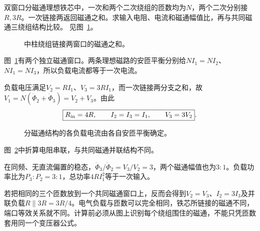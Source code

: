 \begin{exercise}[相同匝数但不同磁通结构]\label{ex:i2-h13}
双窗口分磁通理想铁芯中，一次和两个二次绕组的匝数均为$N$，两个二次分别接$R,3R$。一次链接两返回磁通之和。求输入电阻、电流和磁通幅值比，再与共同磁通三绕组结构比较。 见图~\ref{fig:i2-h13-q}。
\end{exercise}

\begin{figure}[H]\centering
{}
\caption{中柱绕组链接两窗口的磁通之和。}\label{fig:i2-h13-q}
\end{figure}
\begin{solution}
图~\ref{fig:i2-h13-q}有两个独立磁通窗口。两条理想磁路的安匝平衡分别给$NI_1=NI_2$、$NI_1=NI_3$，所以负载电流都等于一次电流。

负载电压满足$V_2=RI_1$、$V_3=3RI_1$，而一次链接两分支之和，故$V_1=N(\dot\Phi_2+\dot\Phi_3)=V_2+V_3$。由此
\[\boxed{R_{\rm in}=4R,\qquad I_2=I_3=I_1,\qquad V_3=3V_2}.
\]

\begin{figure}[H]\centering
{}
\caption{分磁通结构的各负载电流由各自安匝平衡确定。}\label{fig:i2-h13-s}
\end{figure}

图~\ref{fig:i2-h13-s}中折算电阻串联，与共同磁通并联结构不同。

在同频、无直流偏置的稳态，$\dot\Phi_3/\dot\Phi_2=V_3/V_2=3$，两个磁通幅值也为$3:1$。负载功率比为$P_3:P_2=3:1$，总功率$4RI_1^2$等于一次输入。

若把相同的三个匝数放到一个共同磁通窗口上，反而会得到$V_2=V_3$、$I_2=3I_3$及并联负载$R\parallel3R=3R/4$。电气负载与匝数可以完全相同，铁芯所链接的磁通不同，端口等效关系就不同。计算前必须从图上识别每个绕组围住的磁通，不能只凭匝数套用同一个变压器公式。
\end{solution}

